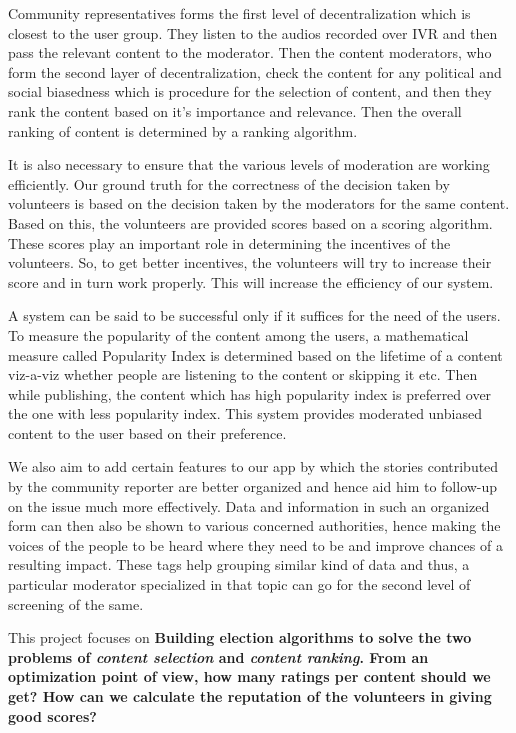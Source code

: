 \documentclass[11pt]{article}
\begin{document}
Community representatives forms the first level of decentralization which is closest to the user group. They listen to the audios recorded over IVR and then pass the relevant content to the moderator. Then the content moderators, who form the second layer of decentralization, check the content for any political and social biasedness which is procedure for the selection of content, and then they rank the content based on it's importance and relevance. Then the overall ranking of content is determined by a ranking algorithm.\newline


It is also necessary to ensure that the various levels of moderation are working efficiently. Our ground truth for the correctness of the decision taken by volunteers is based on the decision taken by the moderators for the same content. Based on this, the volunteers are provided scores based on a scoring algorithm. These scores play an important role in determining the incentives of the volunteers. So, to get better incentives, the volunteers will try to increase their score and in turn work properly. This will increase the efficiency of our system.\newline


A system can be said to be successful only if it suffices for the need of the users. To measure the popularity of the content among the users, a mathematical measure called Popularity Index is determined based on the lifetime of a content viz-a-viz whether people are listening to the content or skipping it etc. Then while publishing, the content which has high popularity index is preferred over the one with less popularity index. This system provides moderated unbiased content to the user based on their preference.\newline


We also aim to add certain features to our app by which the stories contributed by
the community reporter are better organized and hence aid him to follow-up on the issue much more effectively. Data and information in such an organized form can then also be shown to various concerned authorities, hence making the voices of the people to be heard where they need to be and improve chances of a resulting impact. These tags help grouping similar kind of data and thus, a particular moderator specialized in that topic can go for the second level of screening of the same.\newline


This project focuses on \textbf{Building election algorithms to solve the two problems of \textit{content selection} and \textit{content ranking}. From an optimization point of view, how many ratings per content should we get? How can we calculate the reputation of the volunteers in giving good scores?}
   
\end{document}
